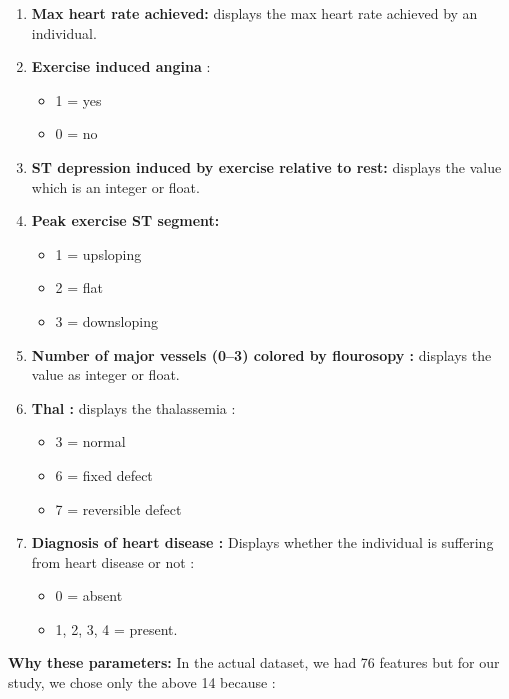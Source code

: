 \documentclass{book}
\begin{document}
\begin{enumerate}
  	\item \textbf{Max heart rate achieved:} displays the max heart rate achieved by an individual.
  	\item \textbf{Exercise induced angina} :
	  	\begin{itemize}
  			\item 1 = yes
  			\item 0 = no
  		\end{itemize}
  	
  	\item \textbf{ST depression induced by exercise relative to rest:} displays the value which is an integer or float.
  	
  	\item \textbf{Peak exercise ST segment:}
  		\begin{itemize}
	  		\item 1 = upsloping
  			\item 2 = flat
  			\item 3 = downsloping
 	 	\end{itemize}
  	
  	\item \textbf{Number of major vessels (0–3) colored by flourosopy :} displays the value as integer or float.
  	
  	\item \textbf{Thal :} displays the thalassemia :
  		\begin{itemize}
  			\item 3 = normal
  			\item 6 = fixed defect
  			\item 7 = reversible defect
  		\end{itemize}
  	
  	\item \textbf{Diagnosis of heart disease :} Displays whether the individual is suffering from heart disease or not :
  	\begin{itemize}
  		\item 0 = absent
  		\item 1, 2, 3, 4 = present.
  	\end{itemize}
  	
  \end{enumerate}

	\textbf{Why these parameters:}
	In the actual dataset, we had 76 features but for our study, we chose only the above 14 because :
	
\end{document}
